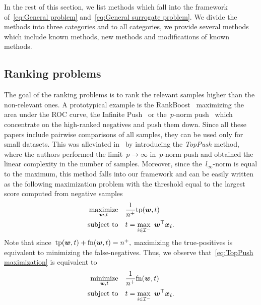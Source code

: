 \documentclass[11pt,a4paper]{article}
\theoremstyle{definition}
\newcommand{\minimize}{\operatorname*{minimize}}
\newcommand{\maximize}{\operatorname*{maximize}}
\newcommand{\st}{\operatorname{subject\ to}}
\newcommand{\I}{\mathcal{I}}
\newcommand{\tp}{\textnormal{tp}}
\newcommand{\fn}{\textnormal{fn}}
\newcommand{\toppush}{\textit{TopPush}\xspace}
\begin{document}
\noindent In the rest of this section, we list methods which fall into the framework of~\eqref{eq:General problem} and~\eqref{eq:General surrogate problem}. We divide the methods into three categories and to all categories, we provide several methods which include known methods, new methods and modifications of known methods.


\subsection{Ranking problems}\label{subsec:Ranking problems}

The goal of the ranking problems is to rank the relevant samples higher than the non-relevant ones. A prototypical example is the RankBoost~\cite{freund2003efficient} maximizing the area under the ROC curve, the Infinite Push~\cite{agarwal2011infinite} or the~$p$-norm push~\cite{rudin2009p} which concentrate on the high-ranked negatives and push them down. Since all these papers include pairwise comparisons of all samples, they can be used only for small datasets. This was alleviated in~\cite{li2014top} by introducing the \toppush method, where the authors performed the limit~$p\to \infty$ in~$p$-norm push and obtained the linear complexity in the number of samples. Moreover, since the~$l_{\infty}$-norm is equal to the maximum, this method falls into our framework and can be easily written as the following maximization problem with the threshold equal to the largest score computed from negative samples
\begin{equation}\label{eq:TopPush maximization}
  \begin{aligned}
    \maximize_{\bm{w}, t} & \quad \frac{1}{n^+}\tp(\bm{w},t) \\
    \st                   & \quad t = \max_{i\in \I^-} \ \bm{w}^\top \bm{x_i}.
  \end{aligned}
\end{equation}
Note that since~$\tp(\bm{w},t)+\fn(\bm{w},t)=n^+,$ maximizing the true-positives is equivalent to minimizing the false-negatives. Thus, we observe that~\eqref{eq:TopPush maximization} is equivalent to
\begin{equation}\label{eq:TopPush minimization}
  \begin{aligned}
    \minimize_{\bm{w}, t} & \quad \frac{1}{n^+}\fn(\bm{w},t) \\
    \st                   & \quad t = \max_{i\in \I^-} \ \bm{w}^\top \bm{x_i}.
  \end{aligned}
\end{equation}
\end{document}
